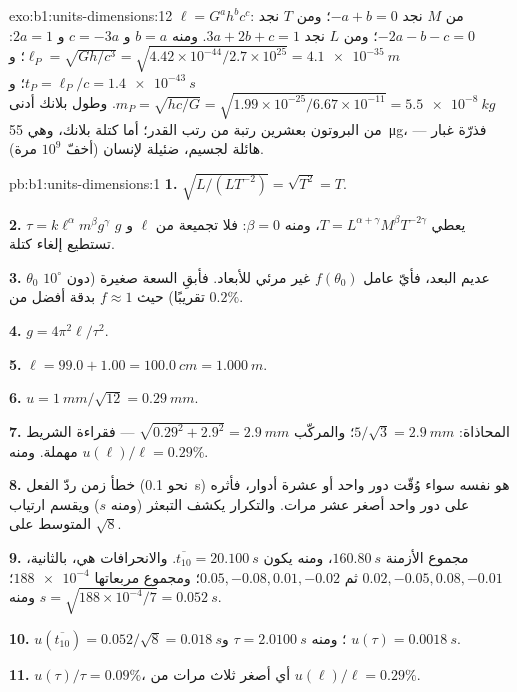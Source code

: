 \begin{solution}{exo:b1:units-dimensions:12}
$\ell = G^a h^b c^c$: من $M$ نجد $-a + b = 0$؛ ومن $T$ نجد $-2a - b - c = 0$؛ ومن $L$
نجد $3a + 2b + c = 1$. ومنه $b = a$ و $c = -3a$ و $2a = 1$:
$\ell_P = \sqrt{Gh/c^3} = \sqrt{4.42\times10^{-44}/2.7\times10^{25}}
= \qty{4.1e-35}{m}$؛ و$t_P = \ell_P/c = \qty{1.4e-43}{s}$؛
و$m_P = \sqrt{hc/G} = \sqrt{1.99\times10^{-25}/6.67\times10^{-11}}
= \qty{5.5e-8}{kg}$. وطول بلانك أدنى من البروتون بعشرين رتبة من رتب
القدر؛ أما كتلة بلانك، وهي \qty{55}{\micro g}، فذرّة غبار --- هائلة
لجسيم، ضئيلة لإنسان (أخفّ $10^9$ مرة).
\end{solution}

\begin{solution}{pb:b1:units-dimensions:1}
\textbf{1.} $\sqrt{L/(L T^{-2})} = \sqrt{T^2} = T$.

\textbf{2.} $\tau = k\ell^\alpha m^\beta g^\gamma$ يعطي
$T = L^{\alpha+\gamma} M^\beta T^{-2\gamma}$، ومنه $\beta = 0$: فلا
تجميعة من $\ell$ و $g$ تستطيع إلغاء كتلة.

\textbf{3.} $\theta_0$ عديم البعد، فأيّ عامل $f(\theta_0)$ غير مرئي
للأبعاد. فأبقِ السعة صغيرة (دون $10^\circ$ تقريبًا) حيث
$f \approx 1$ بدقة أفضل من $0.2\%$.

\textbf{4.} $g = 4\pi^2\ell/\tau^2$.

\textbf{5.} $\ell = 99.0 + 1.00 = \qty{100.0}{cm} = \qty{1.000}{m}$.

\textbf{6.} $u = \qty{1}{mm}/\sqrt{12} = \qty{0.29}{mm}$.

\textbf{7.} المحاذاة: $5/\sqrt3 = \qty{2.9}{mm}$؛ والمركّب
$\sqrt{0.29^2 + 2.9^2} = \qty{2.9}{mm}$ --- فقراءة الشريط
مهملة. ومنه $u(\ell)/\ell = 0.29\%$.

\textbf{8.} خطأ زمن ردّ الفعل (نحو \qty{0.1}{s}) هو نفسه سواء وُقّت
دور واحد أو عشرة أدوار، فأثره على دور واحد أصغر عشر مرات. والتكرار
يكشف التبعثر (ومنه $s$) ويقسم ارتياب المتوسط على $\sqrt8$.

\textbf{9.} مجموع الأزمنة $\qty{160.80}{s}$، ومنه يكون
$\overline{t_{10}} = \qty{20.100}{s}$. والانحرافات هي، بالثانية،
$0.02, -0.05, 0.08, -0.01$ ثم $0.05, -0.08, 0.01, -0.02$؛ ومجموع
مربعاتها $\num{188e-4}$؛ ومنه $s = \sqrt{188\times10^{-4}/7} = \qty{0.052}{s}$.

\textbf{10.} $u(\overline{t_{10}}) = 0.052/\sqrt8 = \qty{0.018}{s}$؛ ومنه
$\tau = \qty{2.0100}{s}$ و $u(\tau) = \qty{0.0018}{s}$.

\textbf{11.} $u(\tau)/\tau = 0.09\%$، أي أصغر ثلاث مرات من
$u(\ell)/\ell = 0.29\%$.


\end{solution}
